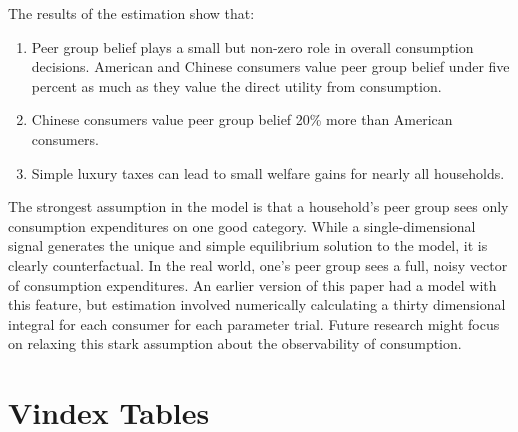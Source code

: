 \documentclass[12pt]{article}
\begin{document}
The results of the estimation show that:
\begin{enumerate}
    \item Peer group belief plays a small but non-zero role in overall consumption decisions.  American and Chinese consumers value peer group belief under five percent as much as they value the direct utility from consumption.
    \item Chinese consumers value peer group belief 20\% more than American consumers.
    \item Simple luxury taxes can lead to small welfare gains for nearly all households.
\end{enumerate}

The strongest assumption in the model is that a household's peer group sees only consumption expenditures on one good category.  While a single-dimensional signal generates the unique and simple equilibrium solution to the model, it is clearly counterfactual.  In the real world, one's peer group sees a full, noisy vector of consumption expenditures.  An earlier version of this paper had a model with this feature, but estimation involved numerically calculating a thirty dimensional integral for each consumer for each parameter trial.  Future research might focus on relaxing this stark assumption about the observability of consumption.

\newpage




\newpage

\appendix

\section{Vindex Tables}
\label{sec:vin_tables}
\end{document}
